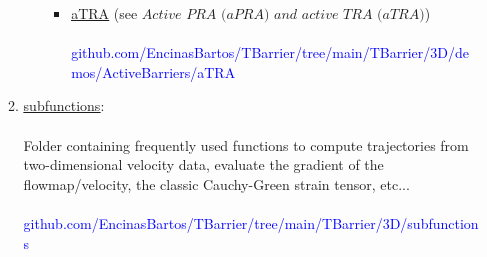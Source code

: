 \documentclass{article}
\begin{document}
\begin{enumerate}
\begin{enumerate}
\begin{enumerate}
\begin{itemize}
  \item \href{https://github.com/EncinasBartos/TBarrier/tree/main/TBarrier/3D/demos/ActiveBarriers/aTRA}{\underline{aTRA}} (see $ \textit{Active PRA (aPRA) and active TRA (aTRA)} $) \\ \\
    \textcolor{blue}{{\footnotesize github.com/EncinasBartos/TBarrier/tree/main/TBarrier/3D/demos/ActiveBarriers/aTRA}} \\
 \end{itemize}
\end{enumerate}
\item \href{https://github.com/EncinasBartos/TBarrier/tree/main/TBarrier/3D/subfunctions}{\underline{subfunctions}}: \\ \\
Folder containing frequently used functions to compute trajectories from two-dimensional velocity data, evaluate the gradient of the flowmap/velocity, the classic Cauchy-Green strain tensor, etc... \\ \\
\textcolor{blue}{{\footnotesize github.com/EncinasBartos/TBarrier/tree/main/TBarrier/3D/subfunctions}}
\end{enumerate}
\end{enumerate}
\end{document}
